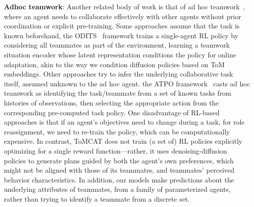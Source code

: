 \textbf{Adhoc teamwork}: Another related body of work is that of ad hoc teamwork~\citep{stone2010adhoc}, where an agent needs to collaborate effectively with other agents without prior coordination or explicit pre-training. Some approaches assume that the task is known beforehand, \eg the ODITS~\citep{gu2022online} framework trains a single-agent RL policy by considering all teammates as part of the environment, learning a teamwork situation encoder whose latent representation conditions the policy for online adaptation, akin to the way we condition diffusion policies based on ToM embeddings. Other approaches try to infer the underlying collaborative task itself, assumed unknown to the ad hoc agent. \Eg the ATPO framework~\citep{ribeiro2023adhoc} casts ad hoc teamwork as identifying the task/teammate from a set of known tasks from histories of observations, then selecting the appropriate action from the corresponding pre-computed task policy. One disadvantage of RL-based approaches is that if an agent's objectives need to change during a task, \eg for role reassignment, we need to re-train the policy, which can be computationally expensive. In contrast, ToMCAT does not train (a set of) RL policies explicitly optimizing for a single reward function---rather, it uses denoising-diffusion policies to generate plans guided by both the agent's own preferences, which might not be aligned with those of its teammates, and teammates' perceived behavior characteristics. In addition, our models make predictions about the underlying attributes of teammates, \ie from a family of parameterized agents, rather than trying to identify a teammate from a discrete set.

